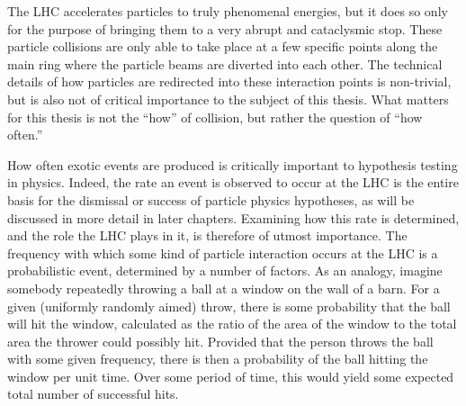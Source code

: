     The LHC accelerates particles to truly phenomenal energies, but it does so only for the purpose of bringing them to a very abrupt and cataclysmic stop.
    These particle collisions are only able to take place at a few specific points along the main ring where the particle beams are diverted into each other.
    The technical details of how particles are redirected into these interaction points is non-trivial, but is also not of critical importance to the subject of this thesis.
    What matters for this thesis is not the ``how'' of collision, but rather the question of ``how often.''

    How often exotic events are produced is critically important to hypothesis testing in physics.
    Indeed, the rate an event is observed to occur at the LHC is the entire basis for the dismissal or success of particle physics hypotheses,
        as will be discussed in more detail in later chapters.
    Examining how this rate is determined, and the role the LHC plays in it, is therefore of utmost importance.
    The frequency with which some kind of particle interaction occurs at the LHC is a probabilistic event, determined by a number of factors.
    As an analogy, imagine somebody repeatedly throwing a ball at a window on the wall of a barn.
    For a given (uniformly randomly aimed) throw, there is some probability that the ball will hit the window,
        calculated as the ratio of the area of the window to the total area the thrower could possibly hit.
    Provided that the person throws the ball with some given frequency, there is then a probability of the ball hitting the window per unit time.
    Over some period of time, this would yield some expected total number of successful hits.

    

